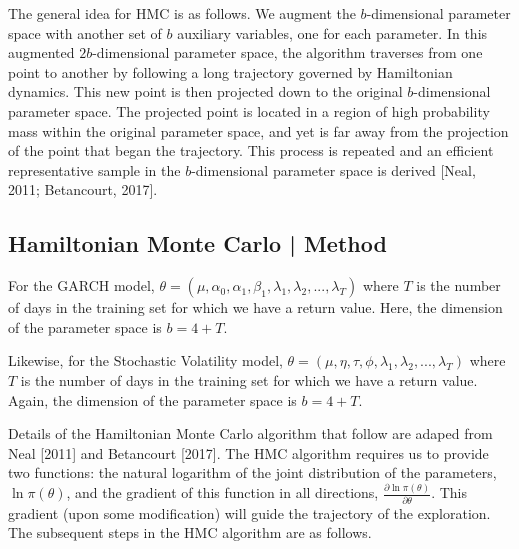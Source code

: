 \documentclass[12pt,letterpaper,reqno,fleqn]{article}
\begin{document}
The general idea for HMC is as follows. We augment the $b$-dimensional parameter space with another set of $b$ auxiliary variables, one for each parameter. In this augmented $2b$-dimensional parameter space, the algorithm traverses from one point to another by following a long trajectory governed by Hamiltonian dynamics. This new point is then projected down to the original $b$-dimensional parameter space. The projected point is located in a region of high probability mass within the original parameter space, and yet is far away from the projection of the point that began the trajectory. This process is repeated and an efficient representative sample in the $b$-dimensional parameter space is derived [Neal, 2011; Betancourt, 2017]. 

\subsection{Hamiltonian Monte Carlo | Method}
For the GARCH model, $\theta = (\mu, \alpha_0, \alpha_1, \beta_1, \lambda_1, \lambda_2, ... , \lambda_T)$ where $T$ is the number of days in the training set for which we have a return value. Here, the dimension of the parameter space is $b = 4 + T$. 

Likewise, for the Stochastic Volatility model, $\theta = (\mu, \eta, \tau, \phi, \lambda_1, \lambda_2, ... , \lambda_T)$ where $T$ is the number of days in the training set for which we have a return value. Again, the dimension of the parameter space is $b = 4 + T$.

Details of the Hamiltonian Monte Carlo algorithm that follow are adaped from Neal [2011] and Betancourt [2017]. The HMC algorithm requires us to provide two functions: the natural logarithm of the joint distribution of the parameters, $\ln\pi(\theta)$, and the gradient of this function in all directions, $\frac{\partial \ln\pi(\theta)}{\partial \theta}$. This gradient (upon some modification) will guide the trajectory of the exploration. The subsequent steps in the HMC algorithm are as follows.
\end{document}
